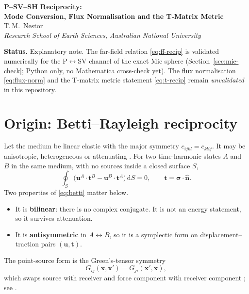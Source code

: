 \documentclass[11pt,a4paper]{article}
\newcommand{\bx}{\mathbf{x}}
\newcommand{\dd}{\mathrm{d}}
\newcommand{\bu}{\mathbf{u}}
\newcommand{\bt}{\mathbf{t}}
\newcommand{\bsig}{\boldsymbol{\sigma}}
\newcommand{\nhat}{\hat{\mathbf{n}}}
\begin{document}
\thispagestyle{plain}
\begin{center}
\vspace*{1em}
{\LARGE\bfseries P--SV--SH Reciprocity:\\[0.3em]
Mode Conversion, Flux Normalisation and the T-Matrix Metric}\\[1.8em]
{\large T.\,M.\ Nestor}\\[0.5em]
{\itshape Research School of Earth Sciences, Australian National University}\\[2em]
\end{center}

\noindent\textbf{Status.} Explanatory note. The far-field relation
\eqref{eq:ff-recip} is validated numerically for the P$\leftrightarrow$SV
channel of the exact Mie sphere (Section~\ref{sec:mie-check}; Python only,
no Mathematica cross-check yet). The flux normalisation
\eqref{eq:flux-norm} and the T-matrix metric statement
\eqref{eq:t-recip} remain \emph{unvalidated} in this repository.

\section{Origin: Betti--Rayleigh reciprocity}
\label{sec:origin}

Let the medium be linear elastic with the major symmetry
$c_{ijkl} = c_{klij}$. It may be anisotropic, heterogeneous or
attenuating \citep{Betti1872,Rayleigh1873,Rayleigh1894,Achenbach2003}.
For two time-harmonic states $A$ and $B$ in the same
medium, with no sources inside a closed surface $S$,
\begin{equation}
  \oint_S \bigl( \bu^A \cdot \bt^B - \bu^B \cdot \bt^A \bigr)\,\dd S = 0,
  \qquad \bt = \bsig \cdot \nhat .
  \label{eq:betti}
\end{equation}
Two properties of \eqref{eq:betti} matter below.
\begin{itemize}
\item It is \textbf{bilinear}: there is no complex conjugate. It is
  not an energy statement, so it survives attenuation.
\item It is \textbf{antisymmetric} in $A \leftrightarrow B$, so it is a
  symplectic form on displacement--traction pairs $(\bu, \bt)$.
\end{itemize}
The point-source form is the Green's-tensor symmetry
\begin{equation}
  G_{ij}(\bx, \bx') = G_{ji}(\bx', \bx),
  \label{eq:green-sym}
\end{equation}
which swaps source with receiver and force component with receiver
component \citep{KnopoffGangi1959}; see \citet[\S2.3]{AkiRichards2002}.
\end{document}
